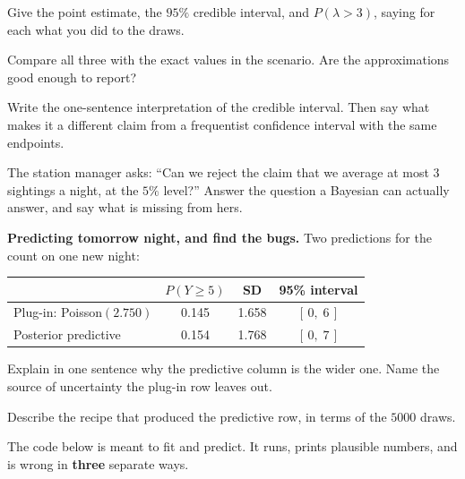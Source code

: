 \documentclass[11pt]{article}
\newcommand{\answerspace}[1]{\vspace{#1}}
\begin{document}
\begin{questions}
\begin{parts}
\item Give the point estimate, the $95\%$ credible interval, and $P(\lambda > 3)$, saying for each
what you did to the draws.
\answerspace{4.5em}

\item Compare all three with the exact values in the scenario. Are the approximations good enough to
report?
\answerspace{3.5em}

\item Write the one-sentence interpretation of the credible interval. Then say what makes it a
different claim from a frequentist confidence interval with the same endpoints.
\answerspace{4.5em}

\item The station manager asks: ``Can we reject the claim that we average at most $3$ sightings a
night, at the $5\%$ level?'' Answer the question a Bayesian can actually answer, and say what is
missing from hers.
\answerspace{4.5em}
\end{parts}

\item \textbf{Predicting tomorrow night, and find the bugs.} Two predictions for the count on one
new night:

\begin{center}
\renewcommand{\arraystretch}{1.2}
\begin{tabular}{lccc}
\toprule
 & $P(Y \ge 5)$ & \textbf{SD} & \textbf{95\% interval} \\
\midrule
Plug-in: Poisson$(2.750)$ & 0.145 & 1.658 & $[\,0,\; 6\,]$ \\
Posterior predictive & 0.154 & 1.768 & $[\,0,\; 7\,]$ \\
\bottomrule
\end{tabular}
\end{center}

\begin{parts}
\item Explain in one sentence why the predictive column is the wider one. Name the source of
uncertainty the plug-in row leaves out.
\answerspace{3.5em}

\item Describe the recipe that produced the predictive row, in terms of the $5000$ draws.
\answerspace{3.5em}

\item The code below is meant to fit and predict. It runs, prints plausible numbers, and is wrong in
\textbf{three} separate ways.


\end{parts}
\end{questions}
\end{document}
